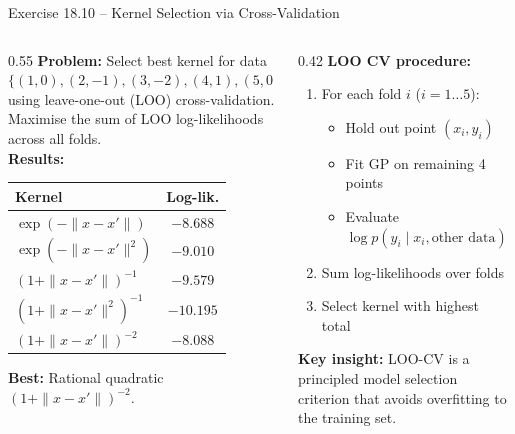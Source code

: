 \documentclass[aspectratio=169,10pt]{beamer}
\begin{document}
\begin{frame}{Exercise 18.10 -- Kernel Selection via Cross-Validation}
  \begin{columns}[T]
    \begin{column}{0.55\textwidth}
      \textbf{Problem:} Select best kernel for data
      $\{(1,0),(2,-1),(3,-2),(4,1),(5,0)\}$ using leave-one-out (LOO)
      cross-validation.\\
      \vspace{0.4em}
      Maximise the sum of LOO log-likelihoods across all folds.\\
      \vspace{0.3em}
      \textbf{Results:}
      \begin{center}
        \renewcommand{\arraystretch}{1.2}
        \begin{tabular}{lc}
          \toprule
          \textbf{Kernel} & \textbf{Log-lik.}\\
          \midrule
          $\exp(-\|x-x'\|)$         & $-8.688$\\
          $\exp(-\|x-x'\|^2)$       & $-9.010$\\
          $(1+\|x-x'\|)^{-1}$       & $-9.579$\\
          $(1+\|x-x'\|^2)^{-1}$     & $-10.195$\\
          $(1+\|x-x'\|)^{-2}$       & $\mathbf{-8.088}$ \\
          \bottomrule
        \end{tabular}
      \end{center}
      \textbf{Best:} Rational quadratic $(1+\|x-x'\|)^{-2}$.
    \end{column}
    \begin{column}{0.42\textwidth}
      \textbf{LOO CV procedure:}
      \begin{enumerate}
        \item For each fold $i$ ($i=1\ldots 5$):
          \begin{itemize}
            \item Hold out point $(x_i, y_i)$
            \item Fit GP on remaining 4 points
            \item Evaluate $\log p(y_i \mid x_i, \text{other data})$
          \end{itemize}
        \item Sum log-likelihoods over folds
        \item Select kernel with highest total
      \end{enumerate}
      \vspace{0.5em}
      \textbf{Key insight:} LOO-CV is a principled model selection
      criterion that avoids overfitting to the training set.
    \end{column}
  \end{columns}
\end{frame}
\end{document}
